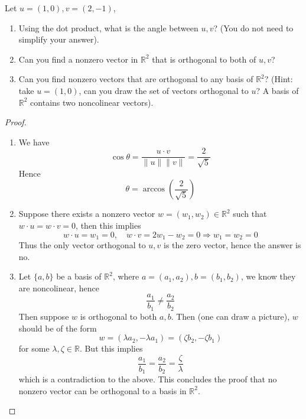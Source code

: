 \documentclass[openany]{book}
\newcommand{\R}{\mathbb{R}}
\begin{document}
\begin{prob}
    Let $u=(1,0), v=(2,-1)$, 
    \begin{enumerate}
        \item Using the dot product, what is the angle between $u,v$? (You do not need to simplify your answer).
        \item Can you find a nonzero vector in $\R^2$ that is orthogonal to both of $u,v$? 
        \item Can you find nonzero vectors that are orthogonal to any basis of $\R^2$? (Hint: take $u=(1,0)$, can you draw the set of vectors orthogonal to $u$? A basis of $\R^2$ contains two noncolinear vectors).
    \end{enumerate}
\end{prob}
\begin{proof}
    \begin{enumerate}
        \item We have 
        \begin{equation*}
            \cos\theta=\frac{u\cdot v}{\|u\|\|v\|}=\frac{2}{\sqrt{5}}
        \end{equation*}
        Hence 
        \begin{equation*}
            \theta=\arccos\left(\frac{2}{\sqrt{5}}\right)
        \end{equation*}
        \item Suppose there exists a nonzero vector $w=(w_1,w_2)\in\R^2$ such that $w\cdot u=w\cdot v=0$, then this implies
        \begin{equation*}
            w\cdot u=w_1=0, \quad w\cdot v=2w_1-w_2=0\Rightarrow w_1=w_2=0
        \end{equation*}
        Thus the only vector orthogonal to $u,v$ is the zero vector, hence the answer is no.
        \item Let $\{a,b\}$ be a basis of $\R^2$, where $a=(a_1,a_2), b=(b_1,b_2)$, we know they are noncolinear, hence 
        \begin{equation*}
            \frac{a_1}{b_1}\neq\frac{a_2}{b_2}
        \end{equation*}
        Then suppose $w$ is orthogonal to both $a,b$. Then (one can draw a picture), $w$ should be of the form 
        \begin{equation*}
            w=(\lambda a_2,-\lambda a_1)=(\zeta b_2, -\zeta b_1)
        \end{equation*}
        for some $\lambda,\zeta\in\R$. But this implies 
        \begin{equation*}
            \frac{a_1}{b_1}=\frac{a_2}{b_2}=\frac{\zeta}{\lambda}
        \end{equation*}
        which is a contradiction to the above. This concludes the proof that no nonzero vector can be orthogonal to a basis in $\R^2$.
    \end{enumerate}
\end{proof}
\end{document}
